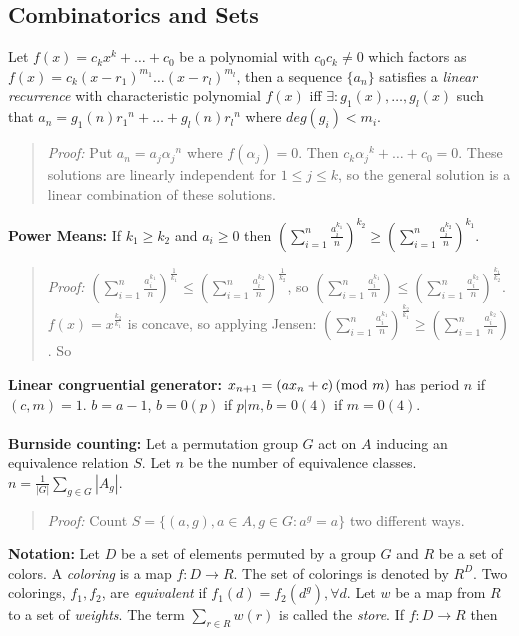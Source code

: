 \subsection{Combinatorics and Sets}
Let $f(x)= c_k x^k + \ldots + c_0$ be a polynomial
with $c_0 c_k \ne 0$ which factors as
$f(x)= c_k {(x- r_1 )}^{m_1} \ldots {(x- r_l )}^{m_l}$, then a sequence
$\{a_n \}$ satisfies a \emph{linear recurrence} with characteristic polynomial
$f(x)$ iff $\exists : g_1 (x) , \ldots , g_l (x)$ such that
$a_n = g_1 (n) {r_1}^n + \ldots + g_l (n) {r_l}^n$ where
$deg(g_{i})<m_{i}$.
\begin{quote}
\emph{Proof:} Put $a_n = a_j {\alpha_j}^n$ where $f(\alpha_j)=0$.
Then $c_k {\alpha_j}^k + \ldots + c_0 = 0$.  These solutions are linearly independent for $1 \leq j \leq k$, so the general solution
is a linear combination of these solutions.
\end{quote}
{\bf Power Means:}  If $k_1 \geq k_2$ and $a_i \geq 0$ then 
$ (\sum_{i=1}^n {\frac {a_i^{k_1}} {n}})^{k_2} \geq (\sum_{i=1}^n {\frac {a_i^{k_2}} {n}})^{k_1} $.
\begin{quote}
\emph{Proof:}
$(\sum_{i=1}^n {\frac {a_i^{k_1}} n})^{\frac 1 {k_1}} \leq (\sum_{i=1}^n {\frac {a_i^{k_2}} n})^{\frac 1 {k_2}}$,
so $(\sum_{i=1}^n {\frac {a_i^{k_1}} n})\leq (\sum_{i=1}^n {\frac {a_i^{k_2}} n})^{\frac {k_1} {k_2}}$.
$f(x) = x^{\frac {k_2} {k_1}}$ is concave, so applying Jensen:
$(\sum_{i=1}^n {\frac {a_i^{k_1}} n})^{\frac {k_2} {k_1}} \geq (\sum_{i=1}^n {\frac {a_i^{k_2}} n})$. So
\end{quote}
{\bf Linear congruential generator:}
$x_{n+1} = (a x_{n} + c) \thinspace \textnormal{(mod } m \textnormal{)}$
has period $n$ if $(c,m)=1$.  $b=a-1$, $b=0 (p)$ if $p|m, b=0 (4)$
if $m=0 (4)$.
\\
\\
{\bf Burnside counting:}  Let a permutation group $G$ act on $A$ inducing an equivalence
relation $S$.  Let $n$ be the number of equivalence classes.
$n= {\frac 1 {|G|}} \sum_{g \in G} |A_g|$.
\begin{quote}
\emph{Proof:}  Count
$S= \{ (a,g), a \in A, g \in G: a^g=a \}$ two different ways.
\end{quote}
{\bf Notation:}
Let $D$ be a set of elements permuted by
a group $G$ and $R$ be a set of colors.  A \emph{coloring} is a map $f:D \rightarrow R$.
The set of colorings is denoted by $R^D$.
Two colorings, $f_1 , f_2$, are \emph{equivalent}
if $f_1(d) = f_2 (d^g ), \forall d$.  Let $w$ be a map from $R$ to a set of \emph{weights}.
The term $\sum_{r \in R} w(r)$ is called the \emph{store}.  If $f: D \rightarrow R$ then
